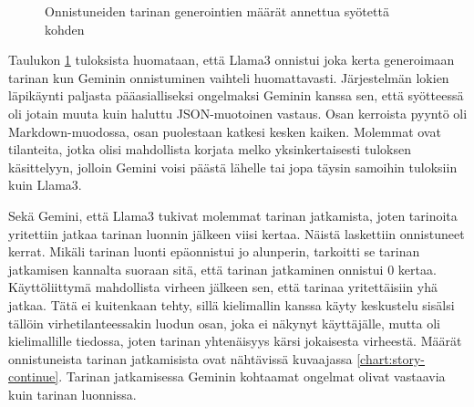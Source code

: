 \begin{figure}[H]
    \centering
    \caption{Onnistuneiden tarinan generointien määrät annettua syötettä kohden}
    \label{chart:story-start}
\end{figure}

Taulukon \ref{chart:story-start} tuloksista huomataan, että Llama3 onnistui
joka kerta generoimaan tarinan kun Geminin onnistuminen vaihteli huomattavasti.
Järjestelmän lokien läpikäynti paljasta pääasialliseksi ongelmaksi Geminin
kanssa sen, että syötteessä oli jotain muuta kuin haluttu JSON-muotoinen
vastaus. Osan kerroista pyyntö oli Markdown-muodossa, osan puolestaan katkesi
kesken kaiken. Molemmat ovat tilanteita, jotka olisi mahdollista korjata melko
yksinkertaisesti tuloksen käsittelyyn, jolloin Gemini voisi päästä lähelle tai
jopa täysin samoihin tuloksiin kuin Llama3.

Sekä Gemini, että Llama3 tukivat molemmat tarinan jatkamista, joten tarinoita
yritettiin jatkaa tarinan luonnin jälkeen viisi kertaa. Näistä laskettiin
onnistuneet kerrat. Mikäli tarinan luonti epäonnistui jo alunperin, tarkoitti
se tarinan jatkamisen kannalta suoraan sitä, että tarinan jatkaminen onnistui
0 kertaa. Käyttöliittymä mahdollista virheen jälkeen sen, että tarinaa
yritettäisiin yhä jatkaa. Tätä ei kuitenkaan tehty, sillä kielimallin kanssa
käyty keskustelu sisälsi tällöin virhetilanteessakin luodun osan, joka ei
näkynyt käyttäjälle, mutta oli kielimallille tiedossa, joten tarinan
yhtenäisyys kärsi jokaisesta virheestä. Määrät onnistuneista tarinan
jatkamisista ovat nähtävissä kuvaajassa \ref{chart:story-continue}. Tarinan
jatkamisessa Geminin kohtaamat ongelmat olivat vastaavia kuin tarinan
luonnissa.

